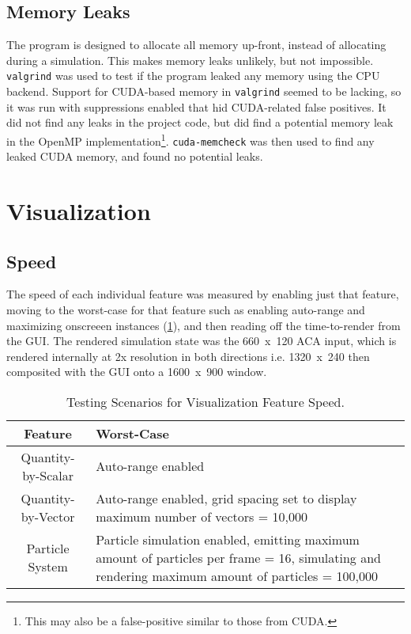 \subsection{Memory Leaks}\label{sec:Results:Sim:Mem}
The program is designed to allocate all memory up-front, instead of allocating during a simulation.
This makes memory leaks unlikely, but not impossible.
\texttt{valgrind} was used to test if the program leaked any memory using the CPU backend.
Support for CUDA-based memory in \texttt{valgrind} seemed to be lacking, so it was run with suppressions enabled that hid CUDA-related false positives.
It did not find any leaks in the project code, but did find a potential memory leak in the OpenMP implementation\footnote{This may also be a false-positive similar to those from CUDA.}.
\texttt{cuda-memcheck} was then used to find any leaked CUDA memory, and found no potential leaks.

\section{Visualization}
\subsection{Speed}\label{sec:Results:Viz:Speed}
The speed of each individual feature was measured by enabling just that feature, moving to the worst-case for that feature such as enabling auto-range and maximizing onscreeen instances (\cref{tab:results:vizworstcases}), and then reading off the time-to-render from the GUI.
The rendered simulation state was the 660~x~120 ACA input, which is rendered internally at 2x resolution in both directions i.e. 1320~x~240 then composited with the GUI onto a 1600~x~900 window.

\begin{table}[]
    \centering
    \begin{tabular}{c|p{}}
        Feature & Worst-Case \\
        \hline
        Quantity-by-Scalar & Auto-range enabled \\
        Quantity-by-Vector & Auto-range enabled, grid spacing set to display maximum number of vectors = 10,000 \\
        Particle System & Particle simulation enabled, emitting maximum amount of particles per frame = 16, simulating and rendering maximum amount of particles = 100,000 \\
    \end{tabular}
    \caption{Testing Scenarios for Visualization Feature Speed.}
    \label{tab:results:vizworstcases}
\end{table}

